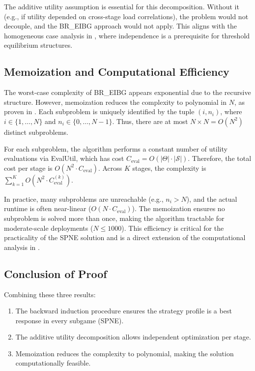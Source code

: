 \documentclass[journal]{IEEEtran}
\theoremstyle{plain}
\theoremstyle{definition}
\theoremstyle{remark}
\begin{document}
The additive utility assumption is essential for this decomposition. Without it (e.g., if utility depended on cross-stage load correlations), the problem would not decouple, and the \textsf{BR\_EIBG} approach would not apply. This aligns with the homogeneous case analysis in \cite{jiang2015indian, section III-B}, where independence is a prerequisite for threshold equilibrium structures.

\subsection{Memoization and Computational Efficiency}
\label{app:proof_thm1_sec3}

The worst-case complexity of \textsf{BR\_EIBG} appears exponential due to the recursive structure. However, memoization reduces the complexity to polynomial in $N$, as proven in \cite{jiang2015indian, section III}. Each subproblem is uniquely identified by the tuple $(i, n_i)$, where $i \in \{1, \dots, N\}$ and $n_i \in \{0, \dots, N-1\}$. Thus, there are at most $N \times N = O(N^2)$ distinct subproblems.

For each subproblem, the algorithm performs a constant number of utility evaluations via \textsf{EvalUtil}, which has cost $C_{\text{eval}} = O(|\Theta| \cdot |\mathcal{S}|)$. Therefore, the total cost per stage is $O(N^2 \cdot C_{\text{eval}})$. Across $K$ stages, the complexity is $\sum_{k=1}^{K} O(N^2 \cdot C_{\text{eval}}^{(k)})$.

In practice, many subproblems are unreachable (e.g., $n_i > N$), and the actual runtime is often near-linear ($O(N \cdot C_{\text{eval}})$). The memoization ensures no subproblem is solved more than once, making the algorithm tractable for moderate-scale deployments ($N \leq 1000$). This efficiency is critical for the practicality of the SPNE solution and is a direct extension of the computational analysis in \cite{jiang2015indian, section III}.

\subsection{Conclusion of Proof}
\label{app:proof_thm1_sec4}

Combining these three results:
\begin{enumerate}
    \item The backward induction procedure ensures the strategy profile is a best response in every subgame (SPNE).
    \item The additive utility decomposition allows independent optimization per stage.
    \item Memoization reduces the complexity to polynomial, making the solution computationally feasible.
\end{enumerate}
\end{document}
